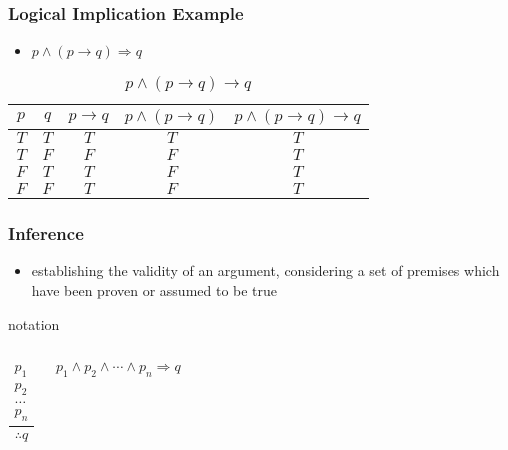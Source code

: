 \documentclass[dvipsnames]{beamer}
\begin{document}
\begin{frame}
  \frametitle{Logical Implication Example}

  \begin{example}
    \begin{itemize}
      \item $p \wedge (p \rightarrow q) \Rightarrow q$
    \end{itemize}

    \begin{table}
      \caption{$p \wedge (p \rightarrow q) \rightarrow q$}
      \begin{tabular}{|c|c|c|c||c|}\hline
        $p$ & $q$ & $p \rightarrow q$ & $p \wedge (p \rightarrow q)$
            & $p \wedge (p \rightarrow q) \rightarrow q$\\\hline\hline
        $T$ & $T$ & $T$ & $T$ & $T$\\\hline
        $T$ & $F$ & $F$ & $F$ & $T$\\\hline
        $F$ & $T$ & $T$ & $F$ & $T$\\\hline
        $F$ & $F$ & $T$ & $F$ & $T$\\\hline
      \end{tabular}
    \end{table}
  \end{example}
\end{frame}

\begin{frame}
  \frametitle{Inference}

  \begin{itemize}
    \item establishing the validity of an argument, considering a set of premises
    which have been proven or assumed to be true
  \end{itemize}

  \pause
  \begin{block}{notation}
    \begin{columns}
      \[
      \frac
        {
          \begin{array}{c}
            p_1\\
            p_2\\
            \dots\\
            p_n
          \end{array}
        }
        {
          \therefore q
        }
      \]

      $p_1 \wedge p_2 \wedge \cdots \wedge p_n \Rightarrow q$
    \end{columns}
  \end{block}
\end{frame}
\end{document}
